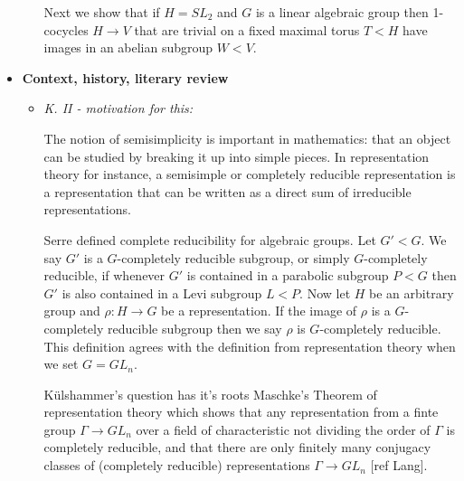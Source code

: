 \begin{itemize}
\begin{itemize}
		Next we show that if $H = SL_2$ and $G$ is a linear algebraic group then 1-cocycles $H\rightarrow V$ that are trivial on a fixed maximal torus $T < H$ have images in an abelian subgroup $W < V$.
	\end{itemize}

	\item[] \textbf{Context, history, literary review}
	\begin{itemize}
		\item \emph{K. II - motivation for this:}
		
		
		The notion of semisimplicity is important in mathematics: that an object can be studied by breaking it up into simple pieces. In representation theory for instance, a semisimple or completely reducible representation is a representation that can be written as a direct sum of irreducible representations.
		
		
		Serre defined complete reducibility for algebraic groups. Let $G' < G$. We say $G'$ is a $G$-completely reducible subgroup, or simply $G$-completely reducible, if whenever $G'$ is contained in a parabolic subgroup $P < G$ then $G'$ is also contained in a Levi subgroup $L < P$. Now let $H$ be an arbitrary group and $\rho:H\rightarrow G$ be a representation. If the image of $\rho$ is a $G$-completely reducible subgroup then we say $\rho$ is $G$-completely reducible. This definition agrees with the definition from representation theory when we set $G=GL_n$.
		
		
		K\"ulshammer's question has it's roots Maschke's Theorem of representation theory which shows that any representation from a finte group $\Gamma \rightarrow GL_n$ over a field of characteristic not dividing the order of $\Gamma$ is completely reducible, and that there are only finitely many conjugacy classes of (completely reducible) representations $\Gamma \rightarrow GL_n$ [ref Lang].
		

\end{itemize}
\end{itemize}

